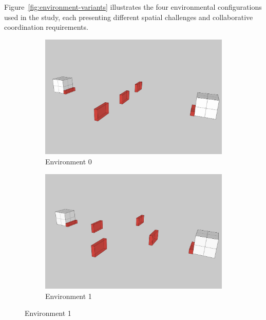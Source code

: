 Figure~\ref{fig:environment-variants} illustrates the four environmental configurations used in the study, each presenting different spatial challenges and collaborative coordination requirements.

\begin{figure}[htbp]
    \centering
    \begin{subfigure}[b]{0.48\textwidth}
        \centering
        \includegraphics[width=\textwidth]{assets/05/environment-0.png}
        \caption{Environment 0}
        \label{fig:env-0}
    \end{subfigure}
    \hfill
    \begin{subfigure}[b]{0.48\textwidth}
        \centering
        \includegraphics[width=\textwidth]{assets/05/environment-1.png}
        \caption{Environment 1}
        \label{fig:env-1}
    \end{subfigure}
    
    \vspace{0.5cm}
    

\end{figure}
